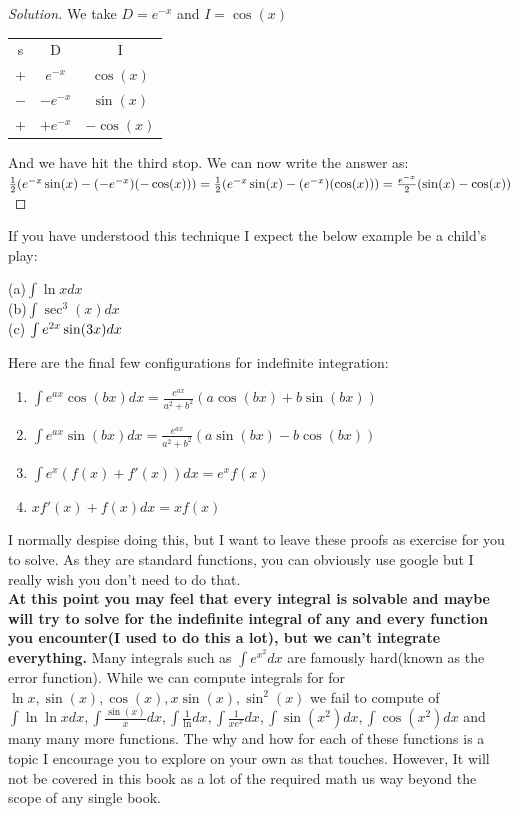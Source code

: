 \begin{proof}
    [Solution]
    We take $D=e^{-x}$ and $I=\cos(x)$
    \begin{table} [H]
        \centering
        \begin{tabular}{c|c|c}
            s & D & I\\
            $+$ & $e^{-x}$ & $\cos(x)$\\
            $-$ & $-e^{-x}$ & $\sin(x)$\\
            $+$ & $+e^{-x}$ & $-\cos(x)$
        \end{tabular}
    \end{table}
    And we have hit the third stop. We can now write the answer as:\\
    $\frac{1}{2}(e^{-x}\sin(x)-(-e^{-x})(-\cos(x)))\\
    = \frac{1}{2}(e^{-x}\sin(x)-(e^{-x})(\cos(x)))\\
    = \frac{e^{-x}}{2}(\sin(x)-\cos(x))
    $
\end{proof}
If you have understood this technique I expect the below example be a child's play:\\
\begin{example}
    (a)$\int \ln{x} dx$\\
    (b)$\int \sec^3(x) dx$\\
    (c) $\int e^{2x} \sin(3x) dx\\$
\end{example}
Here are the final few configurations for indefinite integration:\\
\begin{theorem}
    \begin{enumerate}
        \item $\int e^{ax}\cos(bx)dx=\frac{e^{ax}}{a^2+b^2}(a\cos(bx)+b\sin(bx))$\\
        \item $\int e^{ax}\sin(bx)dx=\frac{e^{ax}}{a^2+b^2}(a\sin(bx)-b\cos(bx))$
        \item $\int e^x(f(x)+f'(x)) dx = e^x f(x)$
        \item $xf'(x) + f(x) dx= xf(x)$        
    \end{enumerate}
\end{theorem}
I normally despise doing this, but I want to leave these proofs as exercise for you to solve. As they are standard functions, you can obviously use google but I really wish you don't need to do that.\\
\textbf{At this point you may feel that every integral is solvable and maybe will try to solve for the indefinite integral of any and every function you encounter(I used to do this a lot), but we can't integrate everything.} Many integrals such as $\int e^{x^2} dx$ are famously hard(known as the error function). While we can compute integrals for for $\ln{x}, \sin(x), \cos(x), x\sin(x),\sin^2(x)$ we fail to compute of $\int \ln{\ln{x}} dx, \int \frac{\sin(x)}{x} dx, \int \frac{1}{\ln} dx, \int \frac{1}{xe^x} dx, \int \sin(x^2)dx, \int \cos(x^2)dx$ and many many more functions. The why and how for each of these functions is a topic I encourage you to explore on your own as that touches. However, It will not be covered in this book as a lot of the required math us way beyond the scope of any single book.
